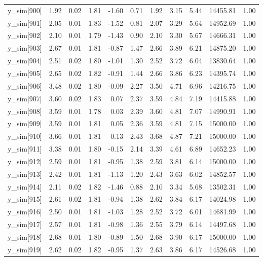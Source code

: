 \begin{table}[ht]
\begin{tabular}{rrrrrrrrrrr}
  y\_sim[900] & 1.92 & 0.02 & 1.81 & -1.60 & 0.71 & 1.92 & 3.15 & 5.44 & 14455.81 & 1.00 \\ 
  y\_sim[901] & 2.05 & 0.01 & 1.83 & -1.52 & 0.81 & 2.07 & 3.29 & 5.64 & 14952.69 & 1.00 \\ 
  y\_sim[902] & 2.10 & 0.01 & 1.79 & -1.43 & 0.90 & 2.10 & 3.30 & 5.67 & 14666.31 & 1.00 \\ 
  y\_sim[903] & 2.67 & 0.01 & 1.81 & -0.87 & 1.47 & 2.66 & 3.89 & 6.21 & 14875.20 & 1.00 \\ 
  y\_sim[904] & 2.51 & 0.02 & 1.80 & -1.01 & 1.30 & 2.52 & 3.72 & 6.04 & 13830.64 & 1.00 \\ 
  y\_sim[905] & 2.65 & 0.02 & 1.82 & -0.91 & 1.44 & 2.66 & 3.86 & 6.23 & 14395.74 & 1.00 \\ 
  y\_sim[906] & 3.48 & 0.02 & 1.80 & -0.09 & 2.27 & 3.50 & 4.71 & 6.96 & 14216.75 & 1.00 \\ 
  y\_sim[907] & 3.60 & 0.02 & 1.83 & 0.07 & 2.37 & 3.59 & 4.84 & 7.19 & 14415.88 & 1.00 \\ 
  y\_sim[908] & 3.59 & 0.01 & 1.78 & 0.03 & 2.39 & 3.60 & 4.81 & 7.07 & 14990.91 & 1.00 \\ 
  y\_sim[909] & 3.59 & 0.01 & 1.81 & 0.05 & 2.36 & 3.59 & 4.81 & 7.15 & 15000.00 & 1.00 \\ 
  y\_sim[910] & 3.66 & 0.01 & 1.81 & 0.13 & 2.43 & 3.68 & 4.87 & 7.21 & 15000.00 & 1.00 \\ 
  y\_sim[911] & 3.38 & 0.01 & 1.80 & -0.15 & 2.14 & 3.39 & 4.61 & 6.89 & 14652.23 & 1.00 \\ 
  y\_sim[912] & 2.59 & 0.01 & 1.81 & -0.95 & 1.38 & 2.59 & 3.81 & 6.14 & 15000.00 & 1.00 \\ 
  y\_sim[913] & 2.42 & 0.01 & 1.81 & -1.13 & 1.20 & 2.43 & 3.63 & 6.02 & 14852.57 & 1.00 \\ 
  y\_sim[914] & 2.11 & 0.02 & 1.82 & -1.46 & 0.88 & 2.10 & 3.34 & 5.68 & 13502.31 & 1.00 \\ 
  y\_sim[915] & 2.61 & 0.02 & 1.81 & -0.94 & 1.38 & 2.62 & 3.84 & 6.17 & 14024.98 & 1.00 \\ 
  y\_sim[916] & 2.50 & 0.01 & 1.81 & -1.03 & 1.28 & 2.52 & 3.72 & 6.01 & 14681.99 & 1.00 \\ 
  y\_sim[917] & 2.57 & 0.01 & 1.81 & -0.98 & 1.36 & 2.55 & 3.79 & 6.14 & 14497.68 & 1.00 \\ 
  y\_sim[918] & 2.68 & 0.01 & 1.80 & -0.89 & 1.50 & 2.68 & 3.90 & 6.17 & 15000.00 & 1.00 \\ 
  y\_sim[919] & 2.62 & 0.02 & 1.82 & -0.95 & 1.37 & 2.63 & 3.86 & 6.17 & 14526.68 & 1.00 \\ 

\end{tabular}
\end{table}
